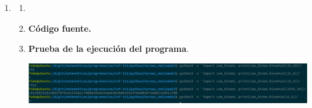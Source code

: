 \begin{enumerate}
\begin{enumerate}[\bfseries a)]
    \end{enumerate}

\newpage

\item

    \begin{enumerate}[\bfseries a)]

	\item

	\item \textbf{Código fuente.}\\ 
	    
	    
	    \vspace{3cm}
	
	\item \textbf{Prueba de la ejecución del programa}.\\
	    \begin{center}
		\includegraphics[scale=.35]{imagenes/tareas_mat/week2/coe_binom.png}
	    \end{center}

    \end{enumerate}

\newpage
\end{enumerate}
